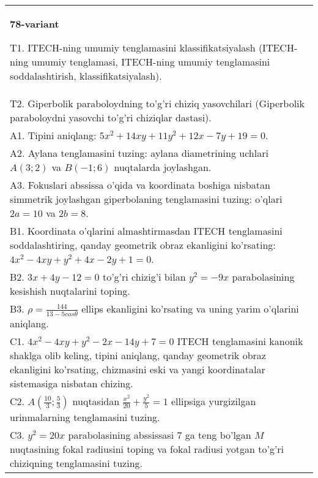 \documentclass{article}
\begin{document}
\begin{tabular}{m{17cm}}
\textbf{78-variant}
\newline

T1. ITECH-ning umumiy tenglamasini klassifikatsiyalash (ITECH-ning umumiy tenglamasi, ITECH-ning umumiy tenglamasini soddalashtirish, klassifikatsiyalash).\\

T2. Giperbolik paraboloydning to'g'ri chiziq yasovchilari (Giperbolik paraboloydni yasovchi to'g'ri chiziqlar dastasi).\\

A1. Tipini aniqlang: $5x^{2}+14xy+11y^{2}+12x-7y+19=0$.\\

A2. Aylana tenglamasini tuzing: aylana diametrining uchlari $A(3;2)$ va $B(-1;6)$ nuqtalarda joylashgan.\\

A3. Fokuslari abssissa o'qida va koordinata boshiga nisbatan simmetrik joylashgan giperbolaning tenglamasini tuzing: o'qlari $2a=10$ va $2b=8$.\\

B1. Koordinata o'qlarini almashtirmasdan ITECH tenglamasini soddalashtiring, qanday geometrik obraz ekanligini ko'rsating: $4x^{2} - 4xy + y^{2} + 4x - 2y + 1 = 0$.  \\

B2. $3x + 4y - 12 = 0$ to'g'ri chizig'i bilan $y^{2} = - 9x$ parabolasining kesishish nuqtalarini toping.  \\

B3. $\rho = \frac{144}{13 - 5cos\theta}$ ellips ekanligini ko'rsating va uning yarim o'qlarini aniqlang.\\

C1. $4x^{2} - 4xy + y^{2} - 2x - 14y + 7 = 0$ ITECH tenglamasini kanonik shaklga olib keling, tipini aniqlang, qanday geometrik obraz ekanligini ko'rsating, chizmasini eski va yangi koordinatalar sistemasiga nisbatan chizing.  \\

C2. $A(\frac{10}{3};\frac{5}{3})$ nuqtasidan $\frac{x^{2}}{20} + \frac{y^{2}}{5} = 1$ ellipsiga yurgizilgan urinmalarning tenglamasini tuzing.  \\

C3. $y^{2} = 20x$ parabolasining abssissasi 7 ga teng bo'lgan $M$ nuqtasining fokal radiusini toping va fokal radiusi yotgan to'g'ri chiziqning tenglamasini tuzing.  \\

\end{tabular}
\vspace{1cm}
\end{document}
